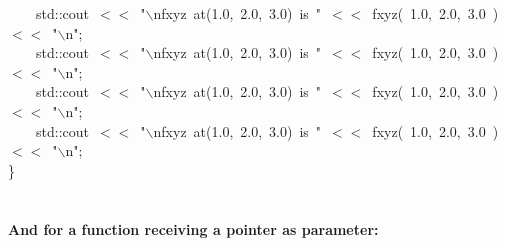 \documentclass[9pt,onside]{article}
\newcommand{\hlstd}[1]{\textcolor[rgb]{0.2,0,0.4}{#1}}
\newcommand{\hlnum}[1]{\textcolor[rgb]{0.2,0.73,0.02}{#1}}
\newcommand{\hlesc}[1]{\textcolor[rgb]{0.65,0.09,0.38}{#1}}
\newcommand{\hlstr}[1]{\textcolor[rgb]{0.09,0.38,0.65}{#1}}
\newcommand{\hlopt}[1]{\textcolor[rgb]{0.33,0.33,0.33}{#1}}
\newcommand{\hlkwd}[1]{\textcolor[rgb]{0.82,0.11,0.93}{#1}}
\begin{document}
{\hlstd{}\hlstd{\ \ \ \ }\hlstd{std}\hlopt{::}\hlstd{cout\ }\hlopt{$<$$<$\ }\hlstd{}\hlstr{"}\hlesc{$\backslash$n}\hlstr{fxyz\ at(1.0,\ 2.0,\ 3.0)\ is\ "}\hlstd{\ }\hlopt{$<$$<$\ }\hlstd{}\hlkwd{fxyz}\hlstd{}\hlopt{(\ }\hlstd{}\hlnum{1.0}\hlstd{}\hlopt{,\ }\hlstd{}\hlnum{2.0}\hlstd{}\hlopt{,\ }\hlstd{}\hlnum{3.0\ }\hlstd{}\hlopt{)\ $<$$<$\ }\hlstd{}\hlstr{"}\hlesc{$\backslash$n}\hlstr{"}\hlstd{}\hlopt{;}\hspace*{\fill}\\
\hlstd{}\hlstd{\ \ \ \ }\hlstd{std}\hlopt{::}\hlstd{cout\ }\hlopt{$<$$<$\ }\hlstd{}\hlstr{"}\hlesc{$\backslash$n}\hlstr{fxyz\ at(1.0,\ 2.0,\ 3.0)\ is\ "}\hlstd{\ }\hlopt{$<$$<$\ }\hlstd{}\hlkwd{fxyz}\hlstd{}\hlopt{(\ }\hlstd{}\hlnum{1.0}\hlstd{}\hlopt{,\ }\hlstd{}\hlnum{2.0}\hlstd{}\hlopt{,\ }\hlstd{}\hlnum{3.0\ }\hlstd{}\hlopt{)\ $<$$<$\ }\hlstd{}\hlstr{"}\hlesc{$\backslash$n}\hlstr{"}\hlstd{}\hlopt{;}\hspace*{\fill}\\
\hlstd{}\hlstd{\ \ \ \ }\hlstd{std}\hlopt{::}\hlstd{cout\ }\hlopt{$<$$<$\ }\hlstd{}\hlstr{"}\hlesc{$\backslash$n}\hlstr{fxyz\ at(1.0,\ 2.0,\ 3.0)\ is\ "}\hlstd{\ }\hlopt{$<$$<$\ }\hlstd{}\hlkwd{fxyz}\hlstd{}\hlopt{(\ }\hlstd{}\hlnum{1.0}\hlstd{}\hlopt{,\ }\hlstd{}\hlnum{2.0}\hlstd{}\hlopt{,\ }\hlstd{}\hlnum{3.0\ }\hlstd{}\hlopt{)\ $<$$<$\ }\hlstd{}\hlstr{"}\hlesc{$\backslash$n}\hlstr{"}\hlstd{}\hlopt{;}\hspace*{\fill}\\
\hlstd{}\hlstd{\ \ \ \ }\hlstd{std}\hlopt{::}\hlstd{cout\ }\hlopt{$<$$<$\ }\hlstd{}\hlstr{"}\hlesc{$\backslash$n}\hlstr{fxyz\ at(1.0,\ 2.0,\ 3.0)\ is\ "}\hlstd{\ }\hlopt{$<$$<$\ }\hlstd{}\hlkwd{fxyz}\hlstd{}\hlopt{(\ }\hlstd{}\hlnum{1.0}\hlstd{}\hlopt{,\ }\hlstd{}\hlnum{2.0}\hlstd{}\hlopt{,\ }\hlstd{}\hlnum{3.0\ }\hlstd{}\hlopt{)\ $<$$<$\ }\hlstd{}\hlstr{"}\hlesc{$\backslash$n}\hlstr{"}\hlstd{}\hlopt{;}\hspace*{\fill}\\
\hlstd{}\hlopt{\}}\hspace*{\fill}\\
\hlstd{}\hspace*{\fill}\\
}
\normalfont
\normalsize

\paragraph{And for a function receiving a pointer as parameter:\\}
\noindent
\ttfamily
\end{document}
